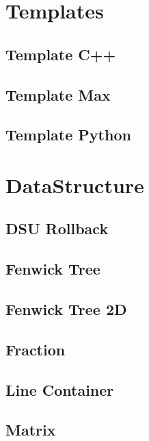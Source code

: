 \section{Templates}
\subsection{Template C++}
\raggedbottom
\hrulefill
\subsection{Template Max}
\raggedbottom
\hrulefill
\subsection{Template Python}
\raggedbottom
\hrulefill
\newpage

\section{DataStructure}
\subsection{DSU Rollback}
\raggedbottom
\hrulefill
\subsection{Fenwick Tree}
\raggedbottom
\hrulefill
\subsection{Fenwick Tree 2D}
\raggedbottom
\hrulefill
\subsection{Fraction}
\raggedbottom
\hrulefill
\subsection{Line Container}
\raggedbottom
\hrulefill
\subsection{Matrix}
\raggedbottom
\hrulefill
